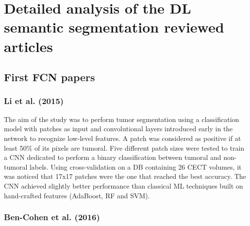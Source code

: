 \chapter{Detailed analysis of the DL semantic segmentation reviewed
articles
}\label{detailed-analysis-of-the-dl-semantic-segmentation-reviewed-articles}

\section{First FCN papers}\label{first-fcn-papers}

\subsection*{Li et al. (2015)}\label{li-et-al.-2015}

The aim of the study was to perform tumor segmentation using a
classification model with patches as input and convolutional layers
introduced early in the network to recognize low-level features. A patch
was considered as positive if at least 50\% of its pixels are tumoral.
Five different patch sizes were tested to train a CNN dedicated to
perform a binary classification between tumoral and non-tumoral labels.
Using cross-validation on a DB containing 26 CECT volumes, it was
noticed that 17x17 patches were the one that reached the best accuracy.
The CNN achieved slightly better performance than classical ML
techniques built on hand-crafted features (AdaBoost, RF and SVM).

\subsection*{Ben-Cohen et al. (2016)}\label{ben-cohen-et-al.-2016}

